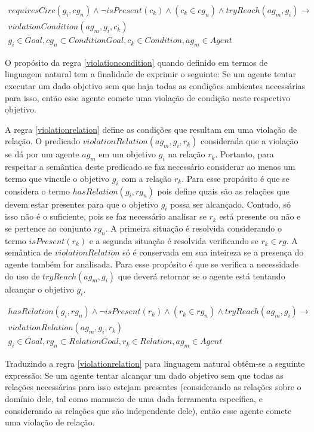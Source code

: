 \begin{eqnarray}\label{violationcondition}\nonumber
	requiresCirc(g_i,cg_n) \wedge \neg isPresent(c_k) \wedge (c_k \in cg_n) \wedge tryReach(ag_m,g_i) \to \nonumber \\  
	violationCondition(ag_m,g_i,c_k) \nonumber \\  
    g_i \in Goal, cg_n \subset ConditionGoal, c_k \in Condition, ag_m \in Agent
\end{eqnarray}

O propósito da regra \ref{violationcondition} quando definido em termos de linguagem natural tem a finalidade de exprimir o seguinte: Se um agente tentar executar um dado objetivo sem que haja todas as condições ambientes necessárias para isso, então esse agente comete uma violação de condição neste respectivo objetivo. 

A regra \ref{violationrelation} define as condições que resultam em uma violação de relação. O predicado $violationRelation(ag_m,g_i,r_k)$ considerada que a violação se dá por um agente $ag_m$ em um objetivo $g_i$ na relação $r_k$. Portanto, para respeitar a semântica deste predicado se faz necessário considerar ao menos um termo que vincule o objetivo $g_i$ com a relação $r_k$. Para esse propósito é que se considera o termo $hasRelation(g_i,rg_n)$ pois define quais são as relações que devem estar presentes para que o objetivo $g_i$ possa ser alcançado. Contudo, só isso não é o suficiente, pois se faz necessário analisar se $r_k$ está presente ou não e se pertence ao conjunto $rg_n$. A primeira situação é resolvida considerando o termo $isPresent(r_k)$ e a segunda situação é resolvida verificando se $r_k \in rg$. A semântica de $violationRelation$ só é conservada em sua inteireza se a presença do agente também for analisada. Para esse propósito é que se verifica a necessidade do uso de $tryReach(ag_m,g_i)$ que deverá retornar se o agente está tentando alcançar o objetivo $g_i$.   

\begin{eqnarray}\label{violationrelation}\nonumber
	hasRelation(g_i,rg_n)\wedge \neg isPresent(r_k) \wedge (r_k \in rg_n) \wedge tryReach(ag_m,g_i) \to \nonumber \\
	violationRelation(ag_m,g_i,r_k) \nonumber \\  
    g_i \in Goal, rg_n \subset RelationGoal, r_k \in Relation, ag_m \in Agent
\end{eqnarray}

Traduzindo a regra \ref{violationrelation} para linguagem natural obtêm-se a seguinte expressão: Se um agente tentar alcançar um dado objetivo sem que todas as relações necessárias para isso estejam presentes (considerando as relações sobre o domínio dele, tal como manuseio de uma dada ferramenta específica, e considerando as relações que são independente dele), então esse agente comete uma violação de relação. 

